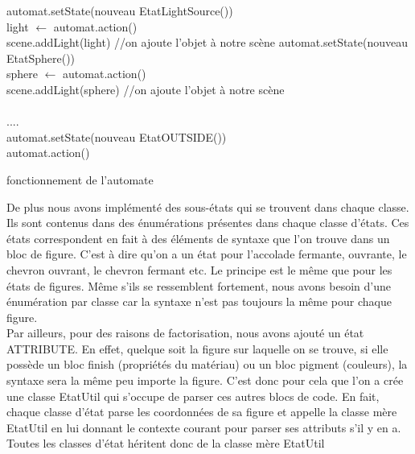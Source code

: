 \documentclass[../../Rapport RayTracer]{subfiles}
\begin{document}
\begin{algorithm}[H]
\DontPrintSemicolon
{}
{
	{
		{
			{
				automat.setState(nouveau EtatLightSource())\hfill\\
				light $\gets$ automat.action()\hfill\\
				scene.addLight(light) //on ajoute l'objet à notre scène
			}
			{
				automat.setState(nouveau EtatSphere())\hfill\\
				sphere $\gets$ automat.action()\hfill\\
				scene.addLight(sphere) //on ajoute l'objet à notre scène\hfill\\
			}
			\hfill\\
			....
			\hfill\\
			{
				automat.setState(nouveau EtatOUTSIDE())\hfill\\
				automat.action()\hfill\\
			}
		}
	}
}
\caption{fonctionnement de l'automate}
\label{exempleAutomat}
\end{algorithm}


De plus nous avons implémenté des sous-états qui se trouvent dans chaque classe. Ils sont contenus dans des énumérations présentes dans chaque classe d'états. 
Ces états correspondent en fait à des éléments de syntaxe que l'on trouve dans un bloc de figure. C'est à dire qu'on a un état pour l'accolade fermante, ouvrante, 
le chevron ouvrant, le chevron fermant etc.
Le principe est le même que pour les états de figures. Même s'ils se ressemblent fortement, nous avons besoin d'une énumération par classe car 
la syntaxe n'est pas toujours la même pour chaque figure.
\\

Par ailleurs, pour des raisons de factorisation, nous avons ajouté un état ATTRIBUTE. En effet, quelque soit la figure sur laquelle on se trouve, 
si elle possède un bloc finish (propriétés du matériau) ou un bloc pigment (couleurs), la syntaxe sera la même peu importe la figure. 
C'est donc pour cela que l'on a crée une classe EtatUtil qui s'occupe de parser ces autres blocs de code. 
En fait, chaque classe d'état parse les coordonnées de sa figure et appelle la classe mère EtatUtil en lui donnant le contexte courant pour parser ses attributs s'il y en a.
Toutes les classes d'état héritent donc de la classe mère EtatUtil
\end{document}
